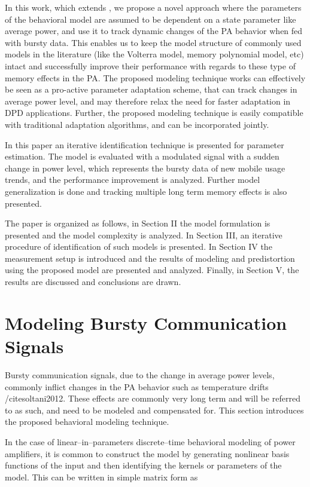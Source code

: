 \documentclass[journal]{IEEEtran}
\begin{document}
In this work, which extends \cite{soltani2012}, we propose a novel approach where the parameters of the behavioral model are assumed to be 
dependent on a state parameter like average power, and use it to track dynamic changes of the PA behavior when fed with bursty data. 
This enables us to keep the model structure of commonly used models in the literature (like the Volterra model, memory polynomial model, etc) intact and successfully improve their performance with regards to these type of memory effects in the PA. The proposed modeling technique works can effectively be seen as a pro-active parameter adaptation scheme, that can track changes in average power level,
and may therefore relax the need for faster adaptation in DPD applications. Further, the proposed modeling technique is easily compatible with traditional adaptation algorithms, and can be incorporated jointly.

In this paper an iterative identification technique is presented for parameter estimation. The model is evaluated with a modulated signal with a sudden change in power level, which represents the bursty data of new mobile usage trends, and the performance improvement is analyzed. Further model generalization is done and tracking multiple long term memory effects is also presented.

The paper is organized as follows, in Section II the model formulation is presented and the model complexity is analyzed. In Section III, an iterative procedure of identification of such models is presented. In Section IV the measurement setup is introduced and the results of modeling and predistortion using the proposed model are presented and analyzed. Finally, in Section V, the results are discussed and conclusions are drawn.

\section{Modeling Bursty Communication Signals}
Bursty communication signals, due to the change in average power levels, commonly inflict changes in the PA behavior such as temperature drifts /cite{soltani2012}.
These effects are commonly very long term and will be referred to as such, and need to be modeled and compensated for. This section introduces the proposed behavioral modeling technique.

In the case of linear--in--parameters discrete--time behavioral modeling of power amplifiers, it is common to construct the model by generating nonlinear basis functions of the input and then identifying the kernels or parameters of the model. This can be written in simple matrix form as
\end{document}
